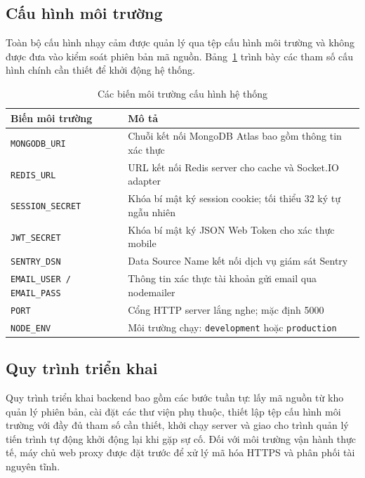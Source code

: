 \documentclass[../DoAn.tex]{subfiles}
\begin{document}
\subsection*{Cấu hình môi trường}

Toàn bộ cấu hình nhạy cảm được quản lý qua tệp cấu hình môi trường và không
được đưa vào kiểm soát phiên bản mã nguồn. Bảng~\ref{tab:env_config} trình bày
các tham số cấu hình chính cần thiết để khởi động hệ thống.

\begin{table}[H]
\centering
\caption{Các biến môi trường cấu hình hệ thống}
\label{tab:env_config}
\small
\begin{tabular}{|p{4.6cm}|p{8.8cm}|}
\hline
\textbf{Biến môi trường} & \textbf{Mô tả} \\
\hline
\texttt{MONGODB\_URI} & Chuỗi kết nối MongoDB Atlas bao gồm thông tin xác thực \\
\hline
\texttt{REDIS\_URL} & URL kết nối Redis server cho cache và Socket.IO adapter \\
\hline
\texttt{SESSION\_SECRET} & Khóa bí mật ký session cookie; tối thiểu 32 ký tự ngẫu nhiên \\
\hline
\texttt{JWT\_SECRET} & Khóa bí mật ký JSON Web Token cho xác thực mobile \\
\hline
\texttt{SENTRY\_DSN} & Data Source Name kết nối dịch vụ giám sát Sentry \\
\hline
\texttt{EMAIL\_USER / EMAIL\_PASS} & Thông tin xác thực tài khoản gửi email qua nodemailer \\
\hline
\texttt{PORT} & Cổng HTTP server lắng nghe; mặc định 5000 \\
\hline
\texttt{NODE\_ENV} & Môi trường chạy: \texttt{development} hoặc \texttt{production} \\
\hline
\end{tabular}
\end{table}

\subsection*{Quy trình triển khai}

Quy trình triển khai backend bao gồm các bước tuần tự: lấy mã nguồn từ kho
quản lý phiên bản, cài đặt các thư viện phụ thuộc, thiết lập tệp cấu hình môi
trường với đầy đủ tham số cần thiết, khởi chạy server và giao cho trình quản lý
tiến trình tự động khởi động lại khi gặp sự cố. Đối với môi trường vận hành
thực tế, máy chủ web proxy được đặt trước để xử lý mã hóa HTTPS và phân phối
tài nguyên tĩnh.
\end{document}
